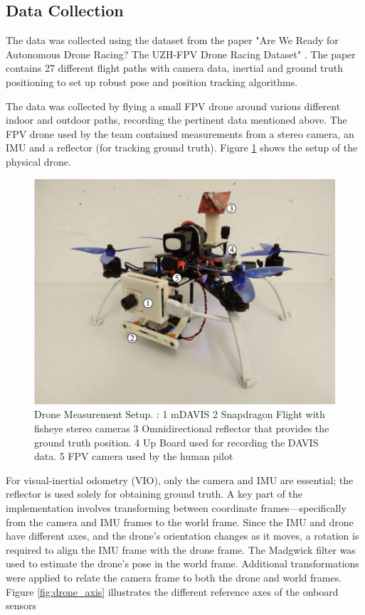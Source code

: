 \documentclass[bare_jrnl_transmag]{subfiles}
\begin{document}
\subsection{Data Collection}

The data was collected using the dataset from the paper "Are We Ready for Autonomous Drone Racing?
The UZH-FPV Drone Racing Dataset" \cite{Delmerico19icra}. The paper contains 27 different flight paths with camera data, inertial and ground truth positioning to set up robust pose and position tracking algorithms. \newline

The data was collected by flying a small FPV drone around various different indoor and outdoor paths, recording the pertinent data mentioned above. The FPV drone used by the team contained measurements from a stereo camera, an IMU and a reflector (for tracking ground truth). Figure  \ref{fig:drone_setup} shows the setup of the physical drone.

\begin{figure}[H]
    \centering
    \includegraphics[width=0.8\linewidth]{figures/drone_setup.jpg}
    \caption{Drone Measurement Setup. : 
    1 mDAVIS 2 Snapdragon Flight with fisheye stereo cameras 3 Omnidirectional reflector that provides the ground truth position. 4 Up Board
    used for recording the DAVIS data. 5 FPV camera used by the human pilot \cite{Delmerico19icra}}
    \label{fig:drone_setup}
\end{figure}

For visual-inertial odometry (VIO), only the camera and IMU are essential; the reflector is used solely for obtaining ground truth. A key part of the implementation involves transforming between coordinate frames—specifically from the camera and IMU frames to the world frame. Since the IMU and drone have different axes, and the drone’s orientation changes as it moves, a rotation is required to align the IMU frame with the drone frame. The Madgwick filter was used to estimate the drone’s pose in the world frame. Additional transformations were applied to relate the camera frame to both the drone and world frames. Figure \ref{fig:drone_axis} illustrates the different reference axes of the onboard sensors
\end{document}
